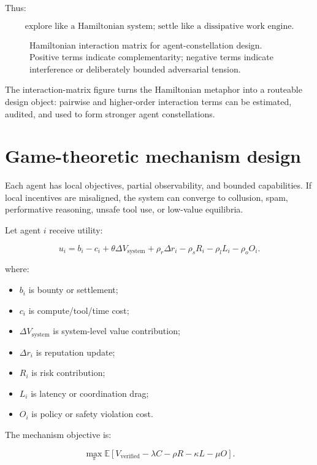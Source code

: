 \documentclass[
  11pt,
]{article}
\providecommand{\tightlist}{%
  \setlength{\itemsep}{0pt}\setlength{\parskip}{0pt}}
\begin{document}
Thus:

\[
\boxed{
\text{explore like a Hamiltonian system; settle like a dissipative work engine.}
}
\]

\begin{figure}
\centering
\resizebox{0.92\textwidth}{!}{}
\caption{Hamiltonian interaction matrix for agent-constellation design.
Positive terms indicate complementarity; negative terms indicate
interference or deliberately bounded adversarial tension.}
\end{figure}

The interaction-matrix figure turns the Hamiltonian metaphor into a routeable design object:
pairwise and higher-order interaction terms can be estimated, audited,
and used to form stronger agent constellations.

\section{Game-theoretic mechanism
design}\label{game-theoretic-mechanism-design}

Each agent has local objectives, partial observability, and bounded
capabilities. If local incentives are misaligned, the system can
converge to collusion, spam, performative reasoning, unsafe tool use, or
low-value equilibria.

Let agent \(i\) receive utility:

\[
u_i=b_i-c_i+\theta\Delta V_{\text{system}}+\rho_r\Delta r_i-\rho_sR_i-\rho_lL_i-\rho_oO_i.
\]

where:

\begin{itemize}
\tightlist
\item
  \(b_i\) is bounty or settlement;
\item
  \(c_i\) is compute/tool/time cost;
\item
  \(\Delta V_{\text{system}}\) is system-level value contribution;
\item
  \(\Delta r_i\) is reputation update;
\item
  \(R_i\) is risk contribution;
\item
  \(L_i\) is latency or coordination drag;
\item
  \(O_i\) is policy or safety violation cost.
\end{itemize}

The mechanism objective is:

\[
\max_{\pi}\mathbb{E}[V_{\text{verified}}-\lambda C-\rho R-\kappa L-\mu O].
\]
\end{document}
